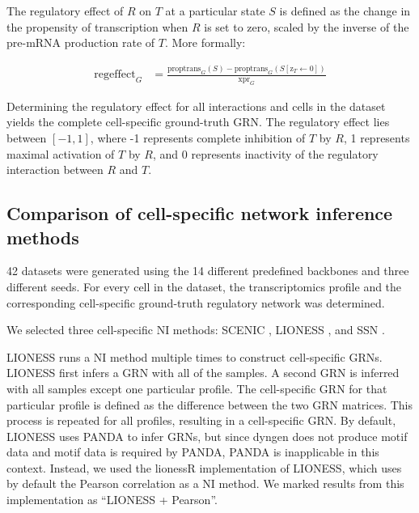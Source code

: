 \documentclass[10pt, a4paper]{article}
\begin{document}
The regulatory effect of \(R\) on \(T\) at a particular state \(S\) is
defined as the change in the propensity of transcription when \(R\) is
set to zero, scaled by the inverse of the pre-mRNA production rate of
\(T\). More formally:

\begin{eqnarray}
	\text{regeffect}_G & = \frac{\text{proptrans}_G(S) - \text{proptrans}_G(S[\text{z}_{T} \leftarrow 0])}{\text{xpr}_{G}}
\end{eqnarray}

Determining the regulatory effect for all interactions and cells in the
dataset yields the complete cell-specific ground-truth GRN. The
regulatory effect lies between \([-1, 1]\), where -1 represents complete
inhibition of \(T\) by \(R\), 1 represents maximal activation of \(T\)
by \(R\), and 0 represents inactivity of the regulatory interaction
between \(R\) and \(T\).

\hypertarget{sec:dyngen-nicompare}{%
	\subsection{Comparison of cell-specific network inference
		methods}\label{sec:dyngen-nicompare}}

42 datasets were generated using the 14 different predefined backbones
and three different seeds. For every cell in the dataset, the
transcriptomics profile and the corresponding cell-specific ground-truth
regulatory network was determined.

We selected three cell-specific NI methods: SCENIC
\cite{aibar_scenicsinglecellregulatory_2017}, LIONESS
\cite{kuijjer_estimatingsamplespecificregulatory_2015,kuijjer_estimatingsamplespecificregulatory_2019},
and SSN \cite{liu_personalizedcharacterizationdiseases_2016}.

LIONESS \cite{kuijjer_estimatingsamplespecificregulatory_2019} runs
a NI method multiple times to construct cell-specific GRNs. LIONESS
first infers a GRN with all of the samples. A second GRN is inferred
with all samples except one particular profile. The cell-specific GRN
for that particular profile is defined as the difference between the two
GRN matrices. This process is repeated for all profiles, resulting in a
cell-specific GRN. By default, LIONESS uses PANDA
\cite{glass_passingmessagesbiological_2013} to infer GRNs, but since
dyngen does not produce motif data and motif data is required by PANDA,
PANDA is inapplicable in this context. Instead, we used the lionessR
\cite{kuijjer_lionessrsinglesample_2019} implementation of LIONESS,
which uses by default the Pearson correlation as a NI method. We marked
results from this implementation as ``LIONESS + Pearson''.
\end{document}
